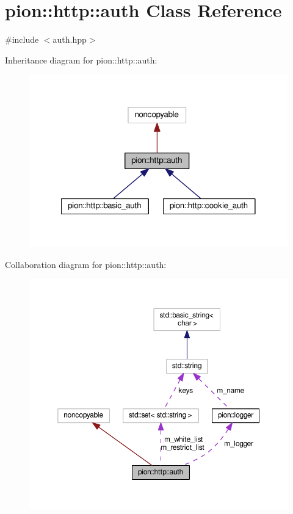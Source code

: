 \hypertarget{classpion_1_1http_1_1auth}{\section{pion\-:\-:http\-:\-:auth Class Reference}
\label{classpion_1_1http_1_1auth}
}


{\ttfamily \#include $<$auth.\-hpp$>$}



Inheritance diagram for pion\-:\-:http\-:\-:auth\-:
\nopagebreak
\begin{figure}[H]
\begin{center}
\leavevmode
\includegraphics[width=317pt]{classpion_1_1http_1_1auth__inherit__graph}
\end{center}
\end{figure}


Collaboration diagram for pion\-:\-:http\-:\-:auth\-:
\nopagebreak
\begin{figure}[H]
\begin{center}
\leavevmode
\includegraphics[width=350pt]{classpion_1_1http_1_1auth__coll__graph}
\end{center}
\end{figure}
